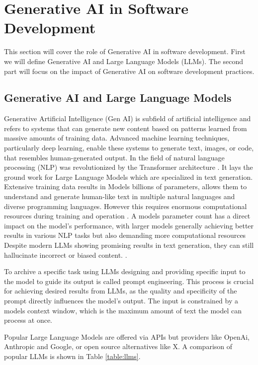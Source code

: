 \section{Generative AI in Software Development}

This section will cover the role of Generative AI in software development. First we will define Generative AI and Large Language Models (LLMs). The second part will focus on the impact of Generative AI on software development practices.
\subsection{Generative AI and Large Language Models}

Generative Artificial Intelligence (Gen AI) is subfield of artificial intelligence and refers to systems that can generate new content based on patterns learned from massive amounts of training data. Advanced machine learning techniques, particularly deep learning, enable these systems to generate text, images, or code, that resembles human-generated output.
In the field of natural language processing (NLP) was revolutionized by the Transformer architecture \cite{changSurveyEvaluationLarge2024}. It lays the ground work for Large Language Models which are specialized in text generation. Extensive training data results in Models billions of parameters, allows them to understand and generate human-like text in multiple natural languages and diverse programming languages. However this requires enormous computational resources during training and operation \cite{LLMsWhatsLarge}. A models parameter count has a direct impact on the model's performance, with larger models generally achieving better results in various NLP tasks but also demanding more computational resources %
Despite modern LLMs showing promising results in text generation, they can still hallucinate incorrect or biased content. \cite{LLMsWhatsLarge}.

To archive a specific task using LLMs designing and providing specific input to the model to guide its output is called prompt engineering. This process is crucial for achieving desired results from LLMs, as the quality and specificity of the prompt directly influences the model's output. The input is constrained by a models context window, which is the maximum amount of text the model can process at once.

Popular Large Language Models are offered via APIs but providers like OpenAi, Anthropic and Google, or open source alternatives like X. A comparison of popular LLMs is shown in Table \ref{table:llms}.

